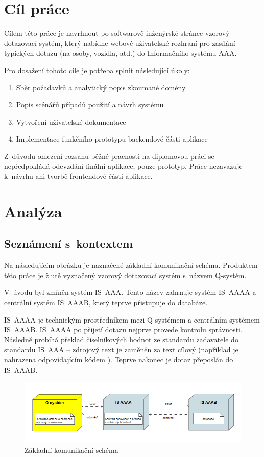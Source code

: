 \documentclass[thesis=M,czech]{FITthesis}[2019/12/23]
\begin{document}
\chapter{Cíl práce}
Cílem této práce je navrhnout po softwarově-inženýrské stránce vzorový dotazovací systém, který nabídne webové uživatelské rozhraní pro zasílání typických dotazů (na osoby, vozidla, atd.) do Informačního systému AAA.

Pro dosažení tohoto cíle je potřeba splnit následující úkoly:
\begin{enumerate}
	\item Sběr požadavků a analytický popis zkoumané domény 
	\item Popis scénářů případů použití a návrh systému
	\item Vytvoření uživatelské dokumentace
	\item Implementace funkčního prototypu backendové části aplikace
\end{enumerate}

Z~důvodu omezení rozsahu běžné pracnosti na diplomovou práci se nepředpokládá odevzdání finální aplikace, pouze prototyp. Práce nezavazuje k~návrhu ani tvorbě frontendové části aplikace.

\chapter{Analýza}
\label{Analyza}
\section{Seznámení s~kontextem}
Na následujícím obrázku je naznačené základní komunikační schéma.
Produktem této práce je žlutě vyznačený vzorový dotazovací systém s~názvem Q-systém.

V~úvodu byl zmíněn systém IS~AAA. Tento název zahrnuje systém IS~AAAA a centrální systém IS~AAAB, který teprve přistupuje do databáze. 

IS~AAAA je technickým prostředníkem mezi Q-systémem a centrálním systémem IS~AAAB. IS~AAAA po přijetí dotazu nejprve provede kontrolu správnosti. Následně probíhá překlad číselníkových hodnot ze standardu zadavatele do standardu IS~AAA -- zdrojový text je zaměněn za text cílový (například  je nahrazena odpovídajícím kódem ). Teprve nakonec je dotaz přeposlán do IS~AAAB. \cite{ICT}

\begin{figure}[H]
  \centering
  \includegraphics[width=\textwidth]{res/design/Základní komunikační schéma.png}
  \caption{Základní komunikační schéma}
  \label{fig:Základní komunikační schéma}
\end{figure}
\end{document}

